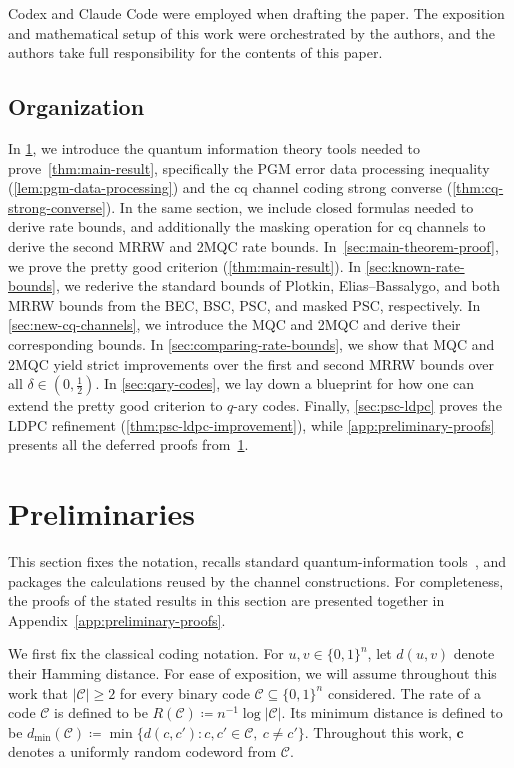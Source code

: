 \documentclass[11pt]{article}
\renewcommand{\geq}{\geqslant}
\theoremstyle{remark}
\newcommand{\cC}{\mathcal{C}}
\newcommand{\bits}{\{0,1\}}
\newcommand{\bc}{\mathbf{c}}
\newcommand{\abs}[1]{\left|#1\right|}
\begin{document}
Codex and Claude Code were employed when drafting the paper. The exposition and mathematical setup of this work were orchestrated by the authors, and the authors take full responsibility for the contents of this paper.

\subsection{Organization}
\label{subsec:organization}

In \cref{sec:preliminaries}, we introduce the quantum information theory tools needed to prove~\cref{thm:main-result}, specifically the PGM error data processing inequality (\cref{lem:pgm-data-processing}) and the cq channel coding strong converse (\cref{thm:cq-strong-converse}). In the same section, we include closed formulas needed to derive rate bounds, and additionally the masking operation for cq channels to derive the second MRRW and 2MQC rate bounds. In~\cref{sec:main-theorem-proof}, we prove the pretty good criterion (\cref{thm:main-result}). In \cref{sec:known-rate-bounds}, we rederive the standard bounds of Plotkin, Elias--Bassalygo, and both MRRW bounds from the BEC, BSC, PSC, and masked PSC, respectively. In \cref{sec:new-cq-channels}, we introduce the MQC and 2MQC and derive their corresponding bounds. In \cref{sec:comparing-rate-bounds}, we show that MQC and 2MQC yield strict improvements over the first and second MRRW bounds over all $\delta \in (0,\frac{1}{2})$. In \cref{sec:qary-codes}, we lay down a blueprint for how one can extend the pretty good criterion to $q$-ary codes. Finally, \cref{sec:psc-ldpc} proves the LDPC refinement (\cref{thm:psc-ldpc-improvement}), while \cref{app:preliminary-proofs} presents all the deferred proofs from~\cref{sec:preliminaries}.

\section{Preliminaries}
\label{sec:preliminaries}

This section fixes the notation, recalls standard quantum-information tools~\cite{NC10,Wil21,Ren22}, and packages the calculations reused by the channel constructions. For completeness, the proofs of the stated results in this section are presented together in Appendix~\ref{app:preliminary-proofs}.

We first fix the classical coding notation. For $u,v \in \bits^n$, let $d(u,v)$ denote their Hamming distance. For ease of exposition, we will assume throughout this work that $\abs{\cC} \geq 2$ for every binary code $\cC \subseteq \bits^n$ considered. The rate of a code $\cC$ is defined to be $R(\cC) \coloneqq n^{-1}\log{\abs{\cC}}$. Its minimum distance is defined to be $d_{\min}(\cC) \coloneqq \min\{d(c,c') : c,c' \in \cC,\ c \neq c'\}$. Throughout this work, $\bc$ denotes a uniformly random codeword from $\cC$.
\end{document}
